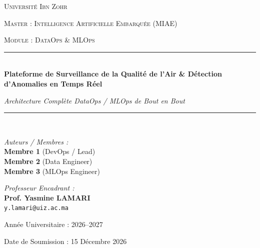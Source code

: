 \documentclass[12pt,a4paper]{article}
\begin{document}
\begin{titlepage}
    \centering
    {\scshape\Large Université Ibn Zohr \par}
    {\scshape\large Master : Intelligence Artificielle Embarquée (MIAE)\par}
    {\scshape\large Module : DataOps \& MLOps \par}
    \vspace{1.5cm}
    
    \rule{\linewidth}{0.5mm} \\[0.4cm]
    {\huge\bfseries Plateforme de Surveillance de la Qualité de l'Air \& Détection d'Anomalies en Temps Réel \\[0.3cm]}
    {\large\itshape Architecture Complète DataOps / MLOps de Bout en Bout\par}
    \rule{\linewidth}{0.5mm} \\[1.5cm]
    
    \begin{minipage}{0.45\textwidth}
        \begin{flushleft} \large
            \emph{Auteurs / Membres :}\\
            \textbf{Membre 1} (DevOps / Lead)\\
            \textbf{Membre 2} (Data Engineer)\\
            \textbf{Membre 3} (MLOps Engineer)
        \end{flushleft}
    \end{minipage}
    \hfill
    \begin{minipage}{0.45\textwidth}
        \begin{flushright} \large
            \emph{Professeur Encadrant :} \\
            \textbf{Prof. Yasmine LAMARI} \\
            \small\texttt{y.lamari@uiz.ac.ma}
        \end{flushright}
    \end{minipage}
    
    \vfill
    {\large Année Universitaire : 2026--2027 \par}
    {\large Date de Soumission : 15 Décembre 2026 \par}
\end{titlepage}
\end{document}
